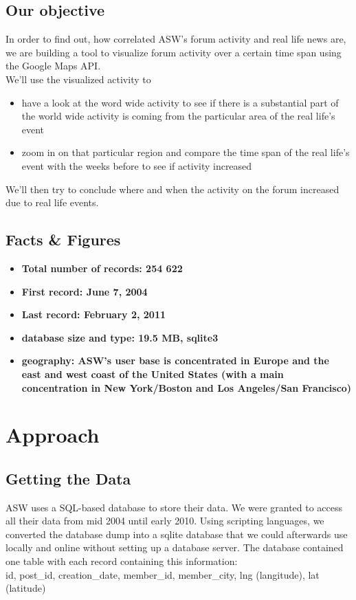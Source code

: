 \documentclass[11pt,a4paper,english]{article}
\begin{document}
		\subsection{Our objective}
			In order to find out, how correlated ASW's forum activity and real life news are, we are building a tool to visualize forum activity over a certain time span using the Google Maps API.
			\\ We'll use the visualized activity to \begin{itemize}
				\item have a look at the word wide activity to see if there is a substantial part of the world wide activity is coming from the particular area of the real life's event
				\item zoom in on that particular region and compare the time span of the real life's event with the weeks before to see if activity increased
			\end{itemize}
			We'll then try to conclude where and when the activity on the forum increased due to real life events.
			
		\subsection{Facts \& Figures}
			\begin{itemize}
				\item \bf Total number of records: \rm 254 622
				\item \bf First record: \rm June 7, 2004
				\item \bf Last record: \rm February 2, 2011
				\item \bf database size and type: \rm 19.5 MB, sqlite3
				\item \bf geography: \rm ASW's user base is concentrated in Europe and the east and west coast of the United States (with a main concentration in New York/Boston and Los Angeles/San Francisco)
			\end{itemize}
			 		
	\section{Approach}
		\subsection{Getting the Data}
		ASW uses a SQL-based database to store their data. We were granted to access all their data from mid 2004 until early 2010. Using scripting languages, we converted the database dump into a sqlite database that we could afterwards use locally and online without setting up a database server. The database contained one table with each record containing this information: 
		\\ id, post\_id, creation\_date, member\_id, member\_city, lng (langitude), lat (latitude) 
		
\end{document}
